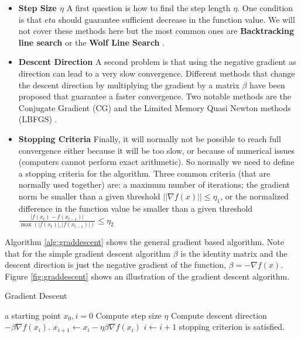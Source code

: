 \begin{itemize}
\item \textbf{Step Size $\eta$} A first question is how to find the step length $\eta$. One condition is that $eta$ should guarantee sufficient decrease in the function value. We will not cover these methods here but the most common ones are \textbf{Backtracking line search} or the \textbf{Wolf Line Search} \citep{Nocedal1999}.
\item \textbf{Descent Direction}  A second problem is that using the negative gradient as direction can lead to a very slow convergence. Different methods that change the descent direction by multiplying the gradient by a matrix $\beta$ have been proposed that guarantee a faster convergence. Two notable methods are the Conjugate Gradient (CG) and the Limited Memory Quasi Newton methods (LBFGS) \citep{Nocedal1999}.
\item \textbf{Stopping Criteria} Finally, it will normally not be possible to reach full convergence either because it will be too slow, or because of numerical issues (computers cannot perform exact arithmetic). So normally we need to define a stopping criteria for the algorithm. Three common criteria (that are normally used together) are: a maximum number of iterations; the gradient norm be smaller than a given threshold   $||\nabla f(x)|| \leq \eta_1$, or the normalized difference in the function value be smaller than a given threshold $\frac{|f(x_t) - f(x_{t-1})|}{\max(|f(x_t)|,|f(x_{t-1})|)} \leq \eta_2$
\end{itemize}

Algorithm \ref{alg:graddescent} shows the general gradient based algorithm. Note that for the simple gradient descent algorithm $\beta$ is the identity matrix and the descent direction is just the negative gradient of the function, $\beta = -\nabla f(x)$. Figure \ref{fig:graddescent} shows an illustration of the gradient descent algorithm.

\begin{algorithm}[h]
\caption{Gradient Descent\label{alg:graddescent}}
\begin{algorithmic}[1]
 a starting point $x_{0}, i=0$
\STATE \quad Compute step size $\eta$
\STATE \quad Compute descent direction $- \beta\nabla f(x_{i})$.
\STATE \quad $x_{i+1} \leftarrow x_{i} - \eta\beta\nabla f(x_{i})$
\STATE \quad $i \leftarrow i + 1$
 stopping criterion is satisfied.
\end{algorithmic}
\end{algorithm}

